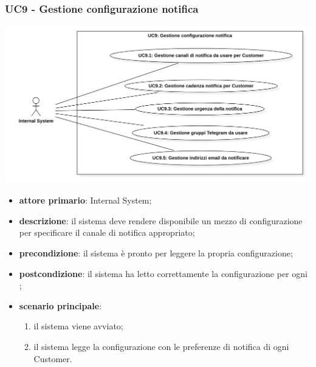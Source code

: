 \subsubsection{UC9 - Gestione configurazione notifica}

\begin{center}
	\includegraphics[keepaspectratio = true, width=15cm]{immagini/uc/6.png}
\end{center}
\begin{itemize}
	\item \textbf{attore primario}: Internal System;
	\item \textbf{descrizione}: il sistema deve rendere disponibile un mezzo di configurazione per specificare il canale di notifica appropriato;
	\item \textbf{precondizione}: il sistema è pronto per leggere la propria configurazione;
	\item \textbf{postcondizione}: il sistema ha letto correttamente la configurazione per ogni ; 
	\item \textbf{scenario principale}: 
	\begin{enumerate}
		\item il sistema viene avviato;
		\item il sistema legge la configurazione con le preferenze di notifica di ogni Customer.
	\end{enumerate}
\end{itemize}
